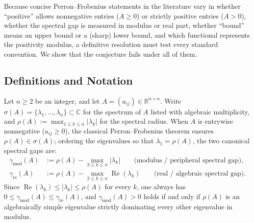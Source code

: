 \documentclass[11pt]{article}
\theoremstyle{definition}
\newcommand{\R}{\mathbb{R}}
\newcommand{\C}{\mathbb{C}}
\DeclareMathOperator{\RePart}{Re}
\begin{document}
Because concise Perron--Frobenius statements in the literature vary in whether ``positive'' allows nonnegative entries ($A \ge 0$) or strictly positive entries ($A > 0$), whether the spectral gap is measured in modulus or real part, whether ``bound'' means an upper bound or a (sharp) lower bound, and which functional represents the positivity modulus, a definitive resolution must test every standard convention. We show that the conjecture fails under all of them.

\subsection{Definitions and Notation}

Let $n \ge 2$ be an integer, and let $A = (a_{ij}) \in \R^{n \times n}$. Write $\sigma(A) = \{\lambda_1, \dots, \lambda_n\} \subset \C$ for the spectrum of $A$ listed with algebraic multiplicity, and $\rho(A) := \max_{1 \le k \le n} |\lambda_k|$ for the spectral radius. When $A$ is entrywise nonnegative ($a_{ij} \ge 0$), the classical Perron--Frobenius theorem ensures $\rho(A) \in \sigma(A)$; ordering the eigenvalues so that $\lambda_1 = \rho(A)$, the two canonical spectral gaps are:
\begin{align}
  \gamma_{\mathrm{mod}}(A) &:= \rho(A) - \max_{2 \le k \le n} |\lambda_k|
  \qquad \text{(modulus / peripheral spectral gap)}, \label{eq:gap-mod}\\
  \gamma_{\mathrm{re}}(A) &:= \rho(A) - \max_{2 \le k \le n} \RePart(\lambda_k)
  \qquad \text{(real / algebraic spectral gap)}. \label{eq:gap-re}
\end{align}
Since $\RePart(\lambda_k) \le |\lambda_k| \le \rho(A)$ for every $k$, one always has $0 \le \gamma_{\mathrm{mod}}(A) \le \gamma_{\mathrm{re}}(A)$, and $\gamma_{\mathrm{mod}}(A) > 0$ holds if and only if $\rho(A)$ is an algebraically simple eigenvalue strictly dominating every other eigenvalue in modulus.
\end{document}
